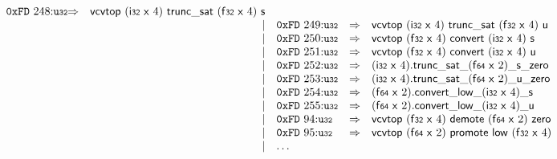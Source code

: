 $$\begin{array}{@{}l@{}rrlll@{}l@{}}
\mathtt{0xFD}~248{:}{\mathtt{u{\scriptstyle32}}} &\Rightarrow& \mathsf{vcvtop}~(\mathsf{i{\scriptstyle32}}~\mathsf{x}~4)~\mathsf{trunc\_sat}~(\mathsf{f{\scriptstyle32}}~\mathsf{x}~4)~\mathsf{s} \\ &&|&
\mathtt{0xFD}~249{:}{\mathtt{u{\scriptstyle32}}} &\Rightarrow& \mathsf{vcvtop}~(\mathsf{i{\scriptstyle32}}~\mathsf{x}~4)~\mathsf{trunc\_sat}~(\mathsf{f{\scriptstyle32}}~\mathsf{x}~4)~\mathsf{u} \\ &&|&
\mathtt{0xFD}~250{:}{\mathtt{u{\scriptstyle32}}} &\Rightarrow& \mathsf{vcvtop}~(\mathsf{f{\scriptstyle32}}~\mathsf{x}~4)~\mathsf{convert}~(\mathsf{i{\scriptstyle32}}~\mathsf{x}~4)~\mathsf{s} \\ &&|&
\mathtt{0xFD}~251{:}{\mathtt{u{\scriptstyle32}}} &\Rightarrow& \mathsf{vcvtop}~(\mathsf{f{\scriptstyle32}}~\mathsf{x}~4)~\mathsf{convert}~(\mathsf{i{\scriptstyle32}}~\mathsf{x}~4)~\mathsf{u} \\ &&|&
\mathtt{0xFD}~252{:}{\mathtt{u{\scriptstyle32}}} &\Rightarrow& (\mathsf{i{\scriptstyle32}}~\mathsf{x}~4) . {{{{{{\mathsf{trunc\_sat}}{\mathsf{\_}}}{(\mathsf{f{\scriptstyle64}}~\mathsf{x}~2)}}{\mathsf{\_}}}{\mathsf{s}}}{\mathsf{\_}}}{\mathsf{zero}} \\ &&|&
\mathtt{0xFD}~253{:}{\mathtt{u{\scriptstyle32}}} &\Rightarrow& (\mathsf{i{\scriptstyle32}}~\mathsf{x}~4) . {{{{{{\mathsf{trunc\_sat}}{\mathsf{\_}}}{(\mathsf{f{\scriptstyle64}}~\mathsf{x}~2)}}{\mathsf{\_}}}{\mathsf{u}}}{\mathsf{\_}}}{\mathsf{zero}} \\ &&|&
\mathtt{0xFD}~254{:}{\mathtt{u{\scriptstyle32}}} &\Rightarrow& (\mathsf{f{\scriptstyle64}}~\mathsf{x}~2) . {{{{{{\mathsf{convert}}{\mathsf{\_}}}{\mathsf{low}}}{\mathsf{\_}}}{(\mathsf{i{\scriptstyle32}}~\mathsf{x}~4)}}{\mathsf{\_}}}{\mathsf{s}} \\ &&|&
\mathtt{0xFD}~255{:}{\mathtt{u{\scriptstyle32}}} &\Rightarrow& (\mathsf{f{\scriptstyle64}}~\mathsf{x}~2) . {{{{{{\mathsf{convert}}{\mathsf{\_}}}{\mathsf{low}}}{\mathsf{\_}}}{(\mathsf{i{\scriptstyle32}}~\mathsf{x}~4)}}{\mathsf{\_}}}{\mathsf{u}} \\ &&|&
\mathtt{0xFD}~94{:}{\mathtt{u{\scriptstyle32}}} &\Rightarrow& \mathsf{vcvtop}~(\mathsf{f{\scriptstyle32}}~\mathsf{x}~4)~\mathsf{demote}~(\mathsf{f{\scriptstyle64}}~\mathsf{x}~2)~\mathsf{zero} \\ &&|&
\mathtt{0xFD}~95{:}{\mathtt{u{\scriptstyle32}}} &\Rightarrow& \mathsf{vcvtop}~(\mathsf{f{\scriptstyle64}}~\mathsf{x}~2)~\mathsf{promote}~\mathsf{low}~(\mathsf{f{\scriptstyle32}}~\mathsf{x}~4) \\ &&|&
\dots \\
\end{array}
$$

